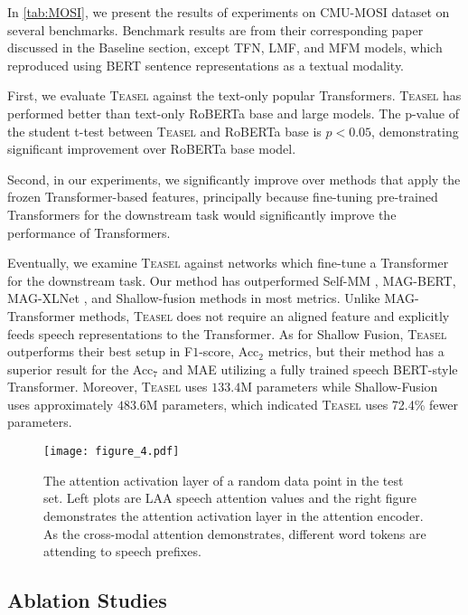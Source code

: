 \documentclass[letterpaper]{article} \usepackage{spconf,amsmath,graphicx}
\newcommand{\teasel}{\textsc{Teasel }}
\begin{document}
In \autoref{tab:MOSI}, we present the results of experiments on CMU-MOSI dataset on several benchmarks. Benchmark results are from their corresponding paper discussed in the Baseline section, except TFN, LMF, and MFM models, which \cite{hazarika2020misa} reproduced using BERT sentence representations as a textual modality.

First, we evaluate \teasel against the text-only popular Transformers. \teasel has performed better than text-only RoBERTa base and large models. The p-value of the student t-test between \teasel and RoBERTa base is $p < 0.05$, demonstrating significant improvement over RoBERTa base model.
    
Second, in our experiments, we significantly improve over methods that apply the frozen Transformer-based features, principally because fine-tuning pre-trained Transformers for the downstream task would significantly improve the performance of Transformers. 
    
Eventually, we examine \teasel against networks which fine-tune a Transformer for the downstream task. Our method has outperformed Self-MM \cite{yu2021le}, MAG-BERT, MAG-XLNet \cite{rahman2020integrating}, and Shallow-fusion \cite{siriwardhana2020jointly} methods in most metrics. Unlike MAG-Transformer methods, \teasel does not require an aligned feature and explicitly feeds speech representations to the Transformer. As for Shallow Fusion, \teasel outperforms their best setup in F$1$-score, Acc$_2$ metrics, but their method has a superior result for the Acc$_7$ and MAE utilizing a fully trained speech BERT-style Transformer. Moreover, \teasel uses $133.4$M parameters while Shallow-Fusion uses approximately $483.6$M parameters, which indicated \teasel uses 72.4\% fewer parameters.







\begin{figure*}[ht]
\centering
\texttt{[image: figure\_4.pdf]}
\caption{The attention activation layer of a random data point in the test set. Left plots are LAA  speech attention values and the right figure demonstrates the attention activation layer in the attention encoder. As the cross-modal attention demonstrates, different word tokens are attending to speech prefixes.}
\label{fig:visualization}
\end{figure*}

\subsection{Ablation Studies}
\label{ssec:ablation studies}
\end{document}
